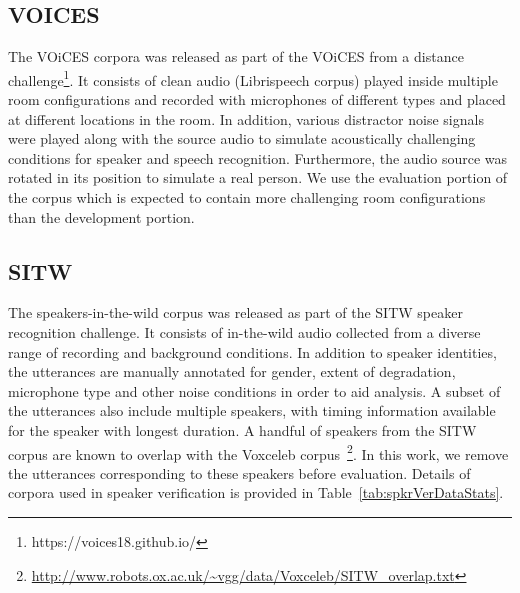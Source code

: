 \subsection{VOICES}
The VOiCES corpora \cite{richey2018voices} was released as part of the VOiCES from a distance challenge\footnote{https://voices18.github.io/}. It consists of clean audio (Librispeech corpus\cite{panayotov_librispeech2015}) played inside multiple room configurations and recorded with microphones of different types and placed at different locations in the room. In addition, various distractor noise signals were played along with the source audio to simulate acoustically challenging conditions for speaker and speech recognition. Furthermore, the audio source was rotated in its position to simulate a real person. 
We use the evaluation portion of the corpus which is expected to contain more challenging room configurations \cite{evalplan_2019voices} than the development portion.

\subsection{SITW}
The speakers-in-the-wild corpus \cite{McLaren_SITWCorpus2016} was released as part of the SITW speaker recognition challenge. It consists of in-the-wild audio collected from a diverse range of recording and background conditions. In addition to speaker identities, the utterances are manually annotated for gender, extent of degradation, microphone type and other noise conditions in order to aid analysis. A subset of the utterances also include multiple speakers, with timing information available for the speaker with longest duration. 
A handful of speakers from the SITW corpus are known to overlap with the Voxceleb corpus~\footnote{\url{http://www.robots.ox.ac.uk/\~vgg/data/Voxceleb/SITW_overlap.txt}}. In this work, we remove the utterances corresponding to these speakers before evaluation. Details of corpora used in speaker verification is provided in Table~\ref{tab:spkrVerDataStats}.

